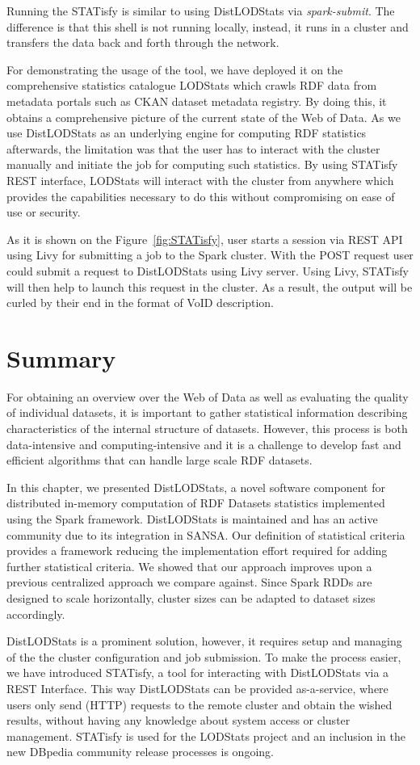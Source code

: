 Running the STATisfy is similar to using DistLODStats via \textit{spark-submit}.
The difference is that this shell is not running locally, instead, it runs in a cluster and transfers the data back and forth through the network.

For demonstrating the usage of the tool, we have deployed it on the comprehensive statistics catalogue LODStats which crawls RDF data from metadata portals such as CKAN dataset metadata registry. By doing this, it obtains a comprehensive picture of the current state of the Web of Data.
As we use DistLODStats as an underlying engine for computing RDF statistics afterwards, the limitation was that the user has to interact with the cluster manually and initiate the job for computing such statistics.
By using STATisfy REST interface, LODStats will interact with the cluster from anywhere which provides the capabilities necessary to do this without compromising on ease of use or security.

As it is shown on the Figure~\ref{fig:STATisfy}, user starts a session via REST API using Livy for submitting a job to the Spark cluster.
With the POST request user could submit a request to DistLODStats using Livy server. 
Using Livy, STATisfy will then help to launch this request in the cluster.
As a result, the output will be curled by their end in the format of VoID description.


\section{Summary}
\label{sec:distlodstats-summary}
For obtaining an overview over the Web of Data as well as evaluating the quality of individual datasets, it is important to gather statistical information describing characteristics of the internal structure of datasets.
However, this process is both data-intensive and computing-intensive and it is a challenge to develop fast and efficient algorithms that can handle large scale RDF datasets.

In this chapter, we presented DistLODStats, a novel software component for distributed in-memory computation of RDF Datasets statistics implemented using the Spark framework.
DistLODStats is maintained and has an active community due to its integration in SANSA. Our definition of statistical criteria provides a framework reducing the implementation effort required for adding further statistical criteria. 
We showed that our approach improves upon a previous centralized approach we compare against.
Since Spark RDDs are designed to scale horizontally, cluster sizes can be adapted to dataset sizes accordingly. 

DistLODStats is a prominent solution, however, it requires setup and managing of the the cluster configuration and job submission.
To make the process easier, we have introduced STATisfy, a tool for interacting with DistLODStats via a REST Interface.
This way DistLODStats can be provided as-a-service, where users only send (HTTP) requests to the remote cluster and obtain the wished results, without having any knowledge about system access or cluster management.
STATisfy is used for the LODStats project and an inclusion in the new DBpedia community release processes is ongoing.